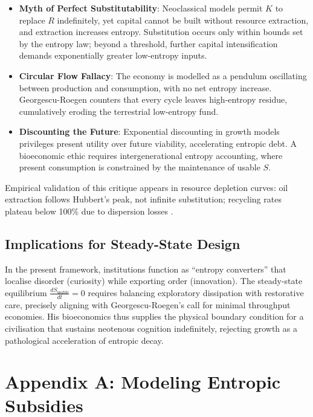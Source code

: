 \documentclass[12pt,a4paper]{article}
\begin{document}
\begin{itemize}
\item \textbf{Myth of Perfect Substitutability}: Neoclassical models permit \(K\) to replace \(R\) indefinitely, 
yet capital cannot be built without resource extraction, and extraction increases entropy. 
Substitution occurs only within bounds set by the entropy law; 
beyond a threshold, further capital intensification demands exponentially greater low-entropy inputs.
\item \textbf{Circular Flow Fallacy}: The economy is modelled as a pendulum oscillating between production and consumption, 
with no net entropy increase. Georgescu-Roegen counters that every cycle leaves high-entropy residue, 
cumulatively eroding the terrestrial low-entropy fund.
\item \textbf{Discounting the Future}: Exponential discounting in growth models 
privileges present utility over future viability, 
accelerating entropic debt. A bioeconomic ethic requires intergenerational entropy accounting, 
where present consumption is constrained by the maintenance of usable \(S\).
\end{itemize}

Empirical validation of this critique appears in resource depletion curves: 
oil extraction follows Hubbert’s peak, not infinite substitution; 
recycling rates plateau below 100\% due to dispersion losses \citep{georgescu1975energy}.

\subsection{Implications for Steady-State Design}

In the present framework, institutions function as ``entropy converters'' 
that localise disorder (curiosity) while exporting order (innovation). 
The steady-state equilibrium \(\frac{dS_{\text{usable}}}{dt} = 0\) 
requires balancing exploratory dissipation with restorative care, 
precisely aligning with Georgescu-Roegen’s call for minimal throughput economies. 
His bioeconomics thus supplies the physical boundary condition 
for a civilisation that sustains neotenous cognition indefinitely, 
rejecting growth as a pathological acceleration of entropic decay.

\appendix

\section{Appendix A: Modeling Entropic Subsidies}
\end{document}
